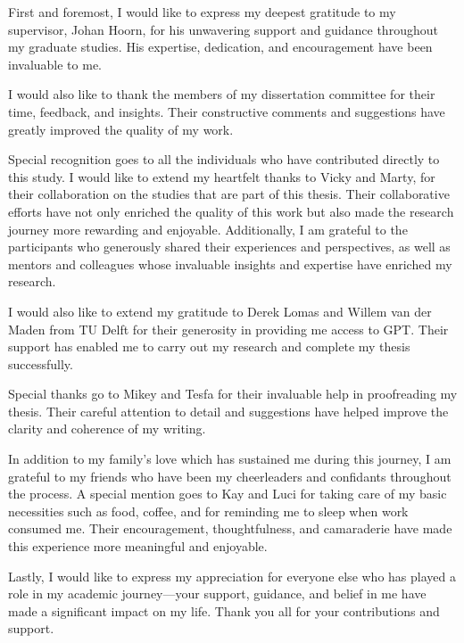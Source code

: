 \singlespacing

First and foremost, I would like to express my deepest gratitude to my supervisor, Johan Hoorn, for his unwavering support and guidance throughout my graduate studies. His expertise, dedication, and encouragement have been invaluable to me.

I would also like to thank the members of my dissertation committee for their time, feedback, and insights. Their constructive comments and suggestions have greatly improved the quality of my work.

Special recognition goes to all the individuals who have contributed directly to this study. I would like to extend my heartfelt thanks to Vicky and Marty, for their collaboration on the studies that are part of this thesis. Their collaborative efforts have not only enriched the quality of this work but also made the research journey more rewarding and enjoyable. Additionally, I am grateful to the participants who generously shared their experiences and perspectives, as well as mentors and colleagues whose invaluable insights and expertise have enriched my research.

I would also like to extend my gratitude to Derek Lomas and Willem van der Maden from TU Delft for their generosity in providing me access to GPT. Their support has enabled me to carry out my research and complete my thesis successfully.

Special thanks go to Mikey and Tesfa for their invaluable help in proofreading my thesis. Their careful attention to detail and suggestions have helped improve the clarity and coherence of my writing.

In addition to my family's love which has sustained me during this journey, I am grateful to my friends who have been my cheerleaders and confidants throughout the process. A special mention goes to Kay and Luci for taking care of my basic necessities such as food, coffee, and for reminding me to sleep when work consumed me.  Their encouragement, thoughtfulness, and camaraderie have made this experience more meaningful and enjoyable.

Lastly, I would like to express my appreciation for everyone else who has played a role in my academic journey—your support, guidance, and belief in me have made a significant impact on my life. Thank you all for your contributions and support.


